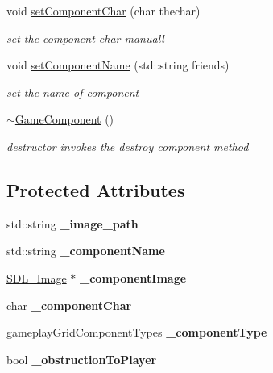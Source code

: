 \begin{DoxyCompactItemize}
\hypertarget{class_game_component_a0a3e912a768389ea43f4a5e83f1b90ba}{}\label{class_game_component_a0a3e912a768389ea43f4a5e83f1b90ba} 
void \hyperlink{class_game_component_a0a3e912a768389ea43f4a5e83f1b90ba}{set\+Component\+Char} (char thechar)
\begin{DoxyCompactList}\small\item\em set the component char manuall \end{DoxyCompactList}\item 
\hypertarget{class_game_component_aa1d0d48b6fb481bf66826d1c3978f492}{}\label{class_game_component_aa1d0d48b6fb481bf66826d1c3978f492} 
void \hyperlink{class_game_component_aa1d0d48b6fb481bf66826d1c3978f492}{set\+Component\+Name} (std\+::string friends)
\begin{DoxyCompactList}\small\item\em set the name of component \end{DoxyCompactList}\item 
\hypertarget{class_game_component_a6d4c3872b9603eb0673655c4b4c0b183}{}\label{class_game_component_a6d4c3872b9603eb0673655c4b4c0b183} 
\hyperlink{class_game_component_a6d4c3872b9603eb0673655c4b4c0b183}{$\sim$\+Game\+Component} ()
\begin{DoxyCompactList}\small\item\em destructor invokes the destroy component method \end{DoxyCompactList}\end{DoxyCompactItemize}
\subsection*{Protected Attributes}
\begin{DoxyCompactItemize}
\item 
\hypertarget{class_game_component_a87432810a6a4a93719f07cdafa640e37}{}\label{class_game_component_a87432810a6a4a93719f07cdafa640e37} 
std\+::string {\bfseries \+\_\+image\+\_\+path}
\item 
\hypertarget{class_game_component_ade1534e7983554793fd5da171cafbdff}{}\label{class_game_component_ade1534e7983554793fd5da171cafbdff} 
std\+::string {\bfseries \+\_\+component\+Name}
\item 
\hypertarget{class_game_component_af705fa08c5b6f3747b79758c595e7fed}{}\label{class_game_component_af705fa08c5b6f3747b79758c595e7fed} 
\hyperlink{class_s_d_l___image}{S\+D\+L\+\_\+\+Image} $\ast$ {\bfseries \+\_\+component\+Image}
\item 
\hypertarget{class_game_component_a8c602a32c902b21a8a30e8156c49e34c}{}\label{class_game_component_a8c602a32c902b21a8a30e8156c49e34c} 
char {\bfseries \+\_\+component\+Char}
\item 
\hypertarget{class_game_component_a3d62d2fb994d69c1c55ed83e4d9506c4}{}\label{class_game_component_a3d62d2fb994d69c1c55ed83e4d9506c4} 
gameplay\+Grid\+Component\+Types {\bfseries \+\_\+component\+Type}
\item 
\hypertarget{class_game_component_aad2dc6eb1db96a5e03faedcbaeabbb4e}{}\label{class_game_component_aad2dc6eb1db96a5e03faedcbaeabbb4e} 
bool {\bfseries \+\_\+obstruction\+To\+Player}
\end{DoxyCompactItemize}


